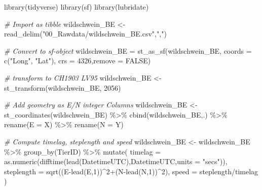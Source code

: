 \documentclass[
]{book}
\newenvironment{Shaded}{\begin{snugshade}}{\end{snugshade}}
\newcommand{\AttributeTok}[1]{\textcolor[rgb]{0.77,0.63,0.00}{#1}}
\newcommand{\CommentTok}[1]{\textcolor[rgb]{0.56,0.35,0.01}{\textit{#1}}}
\newcommand{\ConstantTok}[1]{\textcolor[rgb]{0.00,0.00,0.00}{#1}}
\newcommand{\DecValTok}[1]{\textcolor[rgb]{0.00,0.00,0.81}{#1}}
\newcommand{\FunctionTok}[1]{\textcolor[rgb]{0.00,0.00,0.00}{#1}}
\newcommand{\NormalTok}[1]{#1}
\newcommand{\OtherTok}[1]{\textcolor[rgb]{0.56,0.35,0.01}{#1}}
\newcommand{\SpecialCharTok}[1]{\textcolor[rgb]{0.00,0.00,0.00}{#1}}
\newcommand{\StringTok}[1]{\textcolor[rgb]{0.31,0.60,0.02}{#1}}
\begin{document}
\begin{Shaded}
\begin{Highlighting}[]
\FunctionTok{library}\NormalTok{(tidyverse)}
\FunctionTok{library}\NormalTok{(sf)}
\FunctionTok{library}\NormalTok{(lubridate)}

\CommentTok{\# Import as tibble}
\NormalTok{wildschwein\_BE }\OtherTok{\textless{}{-}} \FunctionTok{read\_delim}\NormalTok{(}\StringTok{"00\_Rawdata/wildschwein\_BE.csv"}\NormalTok{,}\StringTok{","}\NormalTok{)}

\CommentTok{\# Convert to sf{-}object}
\NormalTok{wildschwein\_BE }\OtherTok{=} \FunctionTok{st\_as\_sf}\NormalTok{(wildschwein\_BE, }\AttributeTok{coords =} \FunctionTok{c}\NormalTok{(}\StringTok{"Long"}\NormalTok{, }\StringTok{"Lat"}\NormalTok{), }\AttributeTok{crs =} \DecValTok{4326}\NormalTok{,}\AttributeTok{remove =} \ConstantTok{FALSE}\NormalTok{)}

\CommentTok{\# transform to CH1903 LV95}
\NormalTok{wildschwein\_BE }\OtherTok{\textless{}{-}} \FunctionTok{st\_transform}\NormalTok{(wildschwein\_BE, }\DecValTok{2056}\NormalTok{)}

\CommentTok{\# Add geometry as E/N integer Columns}
\NormalTok{wildschwein\_BE }\OtherTok{\textless{}{-}} \FunctionTok{st\_coordinates}\NormalTok{(wildschwein\_BE) }\SpecialCharTok{\%\textgreater{}\%}
  \FunctionTok{cbind}\NormalTok{(wildschwein\_BE,.) }\SpecialCharTok{\%\textgreater{}\%}
  \FunctionTok{rename}\NormalTok{(}\AttributeTok{E =}\NormalTok{ X) }\SpecialCharTok{\%\textgreater{}\%}
  \FunctionTok{rename}\NormalTok{(}\AttributeTok{N =}\NormalTok{ Y)}

\CommentTok{\# Compute timelag, steplength and speed}
\NormalTok{wildschwein\_BE }\OtherTok{\textless{}{-}}\NormalTok{ wildschwein\_BE }\SpecialCharTok{\%\textgreater{}\%}
  \FunctionTok{group\_by}\NormalTok{(TierID) }\SpecialCharTok{\%\textgreater{}\%}
  \FunctionTok{mutate}\NormalTok{(}
    \AttributeTok{timelag =} \FunctionTok{as.numeric}\NormalTok{(}\FunctionTok{difftime}\NormalTok{(}\FunctionTok{lead}\NormalTok{(DatetimeUTC),DatetimeUTC,}\AttributeTok{units =} \StringTok{"secs"}\NormalTok{)),}
    \AttributeTok{steplength =} \FunctionTok{sqrt}\NormalTok{((E}\SpecialCharTok{{-}}\FunctionTok{lead}\NormalTok{(E,}\DecValTok{1}\NormalTok{))}\SpecialCharTok{\^{}}\DecValTok{2}\SpecialCharTok{+}\NormalTok{(N}\SpecialCharTok{{-}}\FunctionTok{lead}\NormalTok{(N,}\DecValTok{1}\NormalTok{))}\SpecialCharTok{\^{}}\DecValTok{2}\NormalTok{),}
    \AttributeTok{speed =}\NormalTok{ steplength}\SpecialCharTok{/}\NormalTok{timelag}
\NormalTok{  )}
\end{Highlighting}
\end{Shaded}
\end{document}
